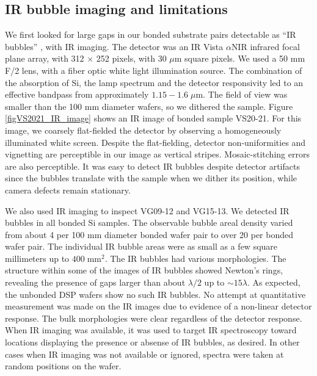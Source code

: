 \documentclass[osajnl,preprint,showpacs,superscriptaddress,12pt]{revtex4-1} %
\begin{document}
\subsection{IR bubble imaging and limitations}

We first looked for large gaps in our bonded substrate pairs detectable as ``IR bubbles'' \cite{1992JEMat..21..669M}, with IR imaging.  The detector was an IR Vista $\alpha$NIR infrared focal plane array, with 312 $\times$ 252 pixels, with 30 $\mu$m square pixels.  We used a 50 mm F/2 lens, with a fiber optic white light illumination source.  The combination of the absorption of Si, the lamp spectrum and the detector responsivity led to an effective bandpass from approximately $1.15-1.6\;\mu$m.  The field of view was smaller than the 100 mm diameter wafers, so we dithered the sample.  Figure \ref{figVS2021_IR_image} shows an IR image of bonded sample VS20-21.  For this image, we coarsely flat-fielded the detector by observing a homogeneously illuminated white screen. Despite the flat-fielding, detector non-uniformities and vignetting are perceptible in our image as vertical stripes.  Mosaic-stitching errors are also perceptible.  It was easy to detect IR bubbles despite detector artifacts since the bubbles translate with the sample when we dither its position, while camera defects remain stationary.  

We also used IR imaging to inspect VG09-12 and VG15-13.  We detected IR bubbles in all bonded Si samples.  The observable bubble areal density varied from about 4 per 100 mm diameter bonded wafer pair to over 20 per bonded wafer pair.  The individual IR bubble areas were as small as a few square millimeters up to $400\;\mathrm{mm}^2$.  The IR bubbles had various morphologies.  The structure within some of the images of IR bubbles showed Newton's rings, revealing the presence of gaps larger than about $\lambda/2$ up to $\sim 15 \lambda$.  As expected, the unbonded DSP wafers show no such IR bubbles.  No attempt at quantitative measurement was made on the IR images due to evidence of a non-linear detector response.  The bulk morphologies were clear regardless of the detector response.  When IR imaging was available, it was used to target IR spectroscopy toward locations displaying the presence or absense of IR bubbles, as desired.  In other cases when IR imaging was not available or ignored, spectra were taken at random positions on the wafer.
\end{document}
